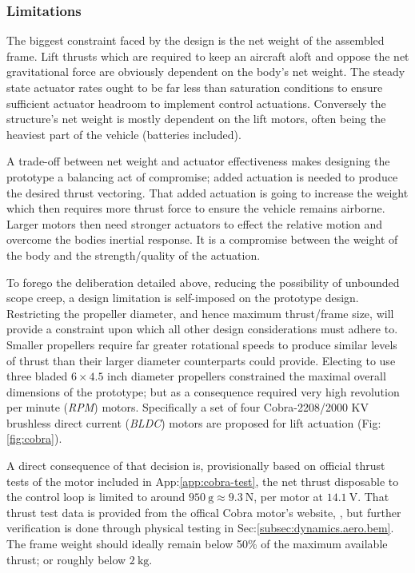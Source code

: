 \subsubsection{Limitations}
\label{subsubsec:intro.foreword.limits}
The biggest constraint faced by the design is the net weight of the assembled frame. Lift thrusts which are required to keep an aircraft aloft and oppose the net gravitational force are obviously dependent on the body's net weight. The steady state actuator rates ought to be far less than saturation conditions to ensure sufficient actuator headroom to implement control actuations. Conversely the structure's net weight is mostly dependent on the lift motors, often being the heaviest part of the vehicle (batteries included). 
\par
A trade-off between net weight and actuator effectiveness makes designing the prototype a balancing act of compromise; added actuation is needed to produce the desired thrust vectoring. That added actuation is going to increase the weight which then requires more thrust force to ensure the vehicle remains airborne. Larger motors then need stronger actuators to effect the relative motion and overcome the bodies inertial response. It is a compromise between the weight of the body and the strength/quality of the actuation.
\par
To forego the deliberation detailed above, reducing the possibility of unbounded scope creep, a design limitation is self-imposed on the prototype design. Restricting the propeller diameter, and hence maximum thrust/frame size, will provide a constraint upon which all other design considerations must adhere to. Smaller propellers require far greater rotational speeds to produce similar levels of thrust than their larger diameter counterparts could provide. Electing to use three bladed $6\times 4.5$ inch diameter propellers constrained the maximal overall dimensions of the prototype; but as a consequence required very high revolution per minute (\emph{RPM}) motors. Specifically a set of four Cobra-2208/2000 KV \cite{cobramotor} brushless direct current (\emph{BLDC}) motors are proposed for lift actuation (Fig:\ref{fig:cobra}). 
\par
A direct consequence of that decision is, provisionally based on official thrust tests of the motor included in App:\ref{app:cobra-test}, the net thrust disposable to the control loop is limited to around $950~\text{g}\approx 9.3~\text{N}$, per motor at $14.1~\text{V}$. That thrust test data is provided from the offical Cobra motor's website, \cite{cobramotor}, but further verification is done through physical testing in Sec:\ref{subsec:dynamics.aero.bem}. The frame weight should ideally remain below 50\% of the maximum available thrust; or roughly below $2~\text{kg}$.
